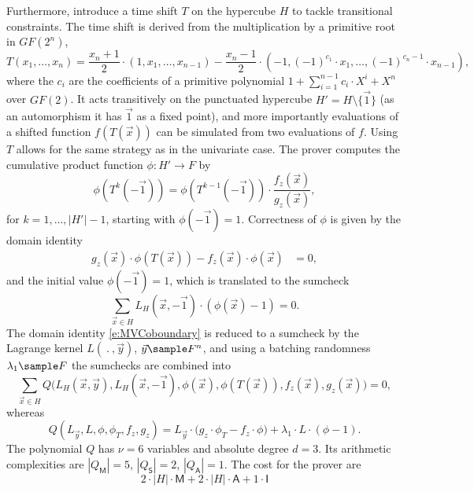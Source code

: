 \documentclass[11pt]{article}
\theoremstyle{definition}
\theoremstyle{remark}
\begin{document}
Furthermore, \cite{Hyperplonk} introduce a time shift $T$ on the hypercube $H$ to tackle transitional constraints.
The time shift is derived from the multiplication by a primitive root in $GF(2^n)$, 
\[
T(x_1, \ldots, x_n) = \frac{x_n +1}{2} \cdot (1, x_1,\ldots, x_{n-1}) - \frac{x_n - 1}{2} \cdot (- 1,(-1)^{c_1}\cdot x_1,\ldots, (-1)^{c_n - 1}\cdot x_{n-1}),
\]  
where the $c_i$ are the coefficients of a primitive polynomial $1 + \sum_{i=1}^{n-1} c_i\cdot X^i + X^n$ over $GF(2)$.
It acts transitively on the punctuated hypercube $H' = H\setminus\{\vec 1\}$ (as an automorphism it has $\vec 1$ as a fixed point), and more importantly evaluations of a shifted function $f(T(\vec x))$ can be simulated from two evaluations of $f$.
Using $T$ allows for the same strategy as in the univariate case. 
The prover computes the cumulative product function $\phi: H' \longrightarrow F$ by
\[
\phi(T^k(-\vec 1)) = \phi(T^{k-1}(-\vec 1)) \cdot \frac{f_z(\vec x)}{g_z(\vec x)},
\]
for $k= 1, \ldots, |H'| - 1$, starting with $\phi(-\vec 1) = 1$.
Correctness of $\phi$ is given by the domain identity 
\begin{align}
\label{e:MVCoboundary}
g_z(\vec x) \cdot \phi(T(\vec x)) - f_z(\vec x) \cdot \phi(\vec x) &= 0,
\end{align}
and the initial value $\phi(-\vec 1) = 1$, which is translated to the sumcheck 
\begin{equation}
\label{e:CoboundaryInit}
\sum_{\vec x \in H} L_H(\vec x, -\vec 1)\cdot (\phi(\vec x) - 1) = 0.
\end{equation}
The domain identity \eqref{e:MVCoboundary} is reduced to a sumcheck by the Lagrange kernel $L(\:.\:, \vec y)$, $\vec y\sample F^n$, and using a batching randomness $\lambda_1\sample F$ the sumchecks are combined into 
\[
\sum_{\vec x\in H}  Q\big(L_H(\vec x,\vec y), L_H(\vec x, -\vec 1), \phi(\vec x), \phi(T(\vec x)), f_z(\vec x), g_z(\vec x) \big) = 0,
\]
whereas 
\begin{equation*}
Q(L_{\vec y}, L, \phi, \phi_T,  f_z, g_z) =
L_{\vec y} \cdot \big( g_z \cdot \phi_T - f_z \cdot \phi \big)
+ \lambda_1\cdot  L\cdot (\phi - 1).
\end{equation*}
The polynomial $Q$ has $\nu=6$ variables and absolute degree $d = 3$. 
Its arithmetic complexities are $|Q_\mathsf M| = 5$, $|Q_\mathsf S|= 2$, $|Q_\mathsf A| = 1$.
The cost for the prover are 
\[
2\cdot |H|\cdot \mathsf M + 2\cdot |H|\cdot\mathsf A + 1\cdot \mathsf I
\] 
\end{document}
